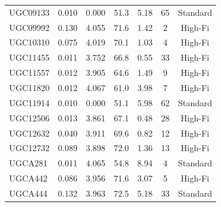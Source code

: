 \begin{longtable}{lcccccc}
UGC09133 & 0.010 & 0.000 & 51.3 & 5.18 & 65 & Standard \\
UGC09992 & 0.130 & 4.055 & 71.6 & 1.42 & 2 & High-Fi \\
UGC10310 & 0.075 & 4.019 & 70.1 & 1.03 & 4 & High-Fi \\
UGC11455 & 0.011 & 3.752 & 66.8 & 0.55 & 33 & High-Fi \\
UGC11557 & 0.012 & 3.905 & 64.6 & 1.49 & 9 & High-Fi \\
UGC11820 & 0.012 & 4.067 & 61.0 & 3.98 & 7 & High-Fi \\
UGC11914 & 0.010 & 0.000 & 51.1 & 5.98 & 62 & Standard \\
UGC12506 & 0.013 & 3.861 & 67.1 & 0.48 & 28 & High-Fi \\
UGC12632 & 0.040 & 3.911 & 69.6 & 0.82 & 12 & High-Fi \\
UGC12732 & 0.089 & 3.898 & 72.0 & 1.36 & 13 & High-Fi \\
UGCA281 & 0.011 & 4.065 & 54.8 & 8.94 & 4 & Standard \\
UGCA442 & 0.086 & 3.956 & 71.6 & 3.07 & 5 & High-Fi \\
UGCA444 & 0.132 & 3.963 & 72.5 & 5.18 & 33 & Standard \\
\bottomrule
\end{longtable}

